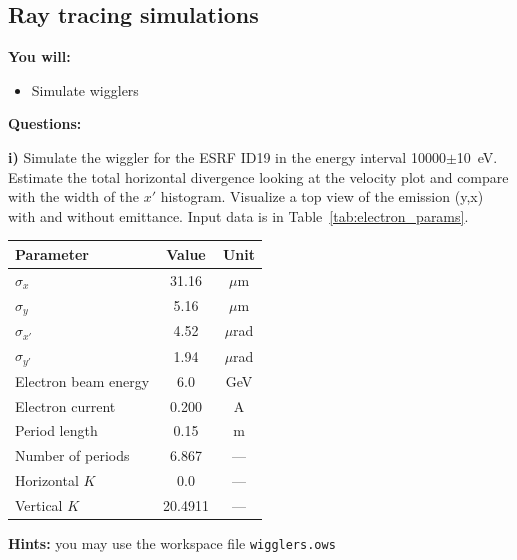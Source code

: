 \subsection{Ray tracing simulations}

\begin{youwillbox}
\textbf{You will:}

\begin{itemize}
    \item Simulate wigglers
\end{itemize}
\end{youwillbox}

\begin{questionsbox}
\textbf{Questions:}

\textbf{i)} Simulate the wiggler for the ESRF ID19 in the energy interval 10000$\pm$10~eV. Estimate the total horizontal divergence looking at the velocity plot and compare with the  width of the $x'$ histogram. Visualize a top view of the emission (y,x) with and without emittance. Input data is in Table~\ref{tab:electron_params}.

\begin{center}
\label{tab:electron_params}
\begin{tabular}{lcc}
\hline
\textbf{Parameter} & \textbf{Value} & \textbf{Unit} \\
\hline
$\sigma_x$ & 31.16 & $\mu$m \\
$\sigma_y$ & 5.16 & $\mu$m \\
$\sigma_{x'}$ & 4.52 & $\mu$rad \\
$\sigma_{y'}$ & 1.94 & $\mu$rad \\
Electron beam energy & 6.0 & GeV \\
Electron current & 0.200 & A \\
\hline
Period length & 0.15 & m \\
Number of periods & 6.867 & --- \\
Horizontal $K$ & 0.0 & --- \\
Vertical $K$ & 20.4911 & --- \\
\hline
\end{tabular}
\end{center}
\end{questionsbox}

\begin{hintsbox}
\textbf{Hints:} you may use the workspace file {\tt wigglers.ows}
\end{hintsbox}

